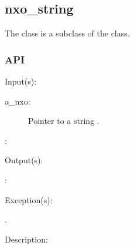 %
%
%
%
%              

\subsection{nxo\_string}
\label{nxo_string}

The  class is a subclass of the  class.

\subsubsection{API}
\begin{capi}
\label{nxo_string_}
	\begin{capilist}
	\item[Input(s): ]
		\begin{description}\item[]
		\item[a\_nxo: ]
			Pointer to a string .
		\item[: ]
		\end{description}
	\item[Output(s): ]
		\begin{description}\item[]
		\item[: ]
		\end{description}
	\item[Exception(s): ]
		\begin{description}\item[]
		\item[.]
		\end{description}
	\item[Description: ]
	\end{capilist}
\end{capi}
